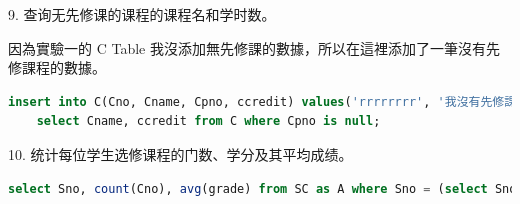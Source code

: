 \documentclass[12pt, a4paper]{report}
\begin{document}
9. 查询无先修课的课程的课程名和学时数。

因為實驗一的 C Table 我沒添加無先修課的數據，所以在這裡添加了一筆沒有先修課程的數據。\\

\begin{lstlisting}[language=SQL]
    insert into C(Cno, Cname, Cpno, ccredit) values('rrrrrrrr', '我沒有先修課', null, 100);
    select Cname, ccredit from C where Cpno is null;
\end{lstlisting}

\begin{figure}[H] %
    \centering %
\end{figure}


\begin{figure}[H] %
    \centering %
\end{figure}

10. 统计每位学生选修课程的门数、学分及其平均成绩。\\

\begin{lstlisting}[language=SQL]
    select Sno, count(Cno), avg(grade) from SC as A where Sno = (select Sno from SC as B where A.Sno = B.Sno)  group by Sno;
\end{lstlisting}
\end{document}
